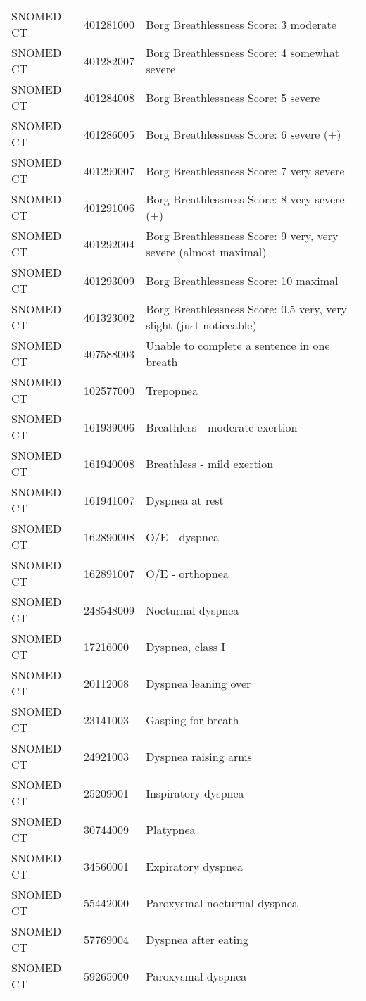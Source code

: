 \begin{longtable}{p{}p{}p{}}
  SNOMED CT & 401281000 & Borg Breathlessness Score: 3 moderate \\ 
  SNOMED CT & 401282007 & Borg Breathlessness Score: 4 somewhat severe \\ 
  SNOMED CT & 401284008 & Borg Breathlessness Score: 5 severe \\ 
  SNOMED CT & 401286005 & Borg Breathlessness Score: 6 severe (+) \\ 
  SNOMED CT & 401290007 & Borg Breathlessness Score: 7 very severe \\ 
  SNOMED CT & 401291006 & Borg Breathlessness Score: 8 very severe (+) \\ 
  SNOMED CT & 401292004 & Borg Breathlessness Score: 9 very, very severe (almost maximal) \\ 
  SNOMED CT & 401293009 & Borg Breathlessness Score: 10 maximal \\ 
  SNOMED CT & 401323002 & Borg Breathlessness Score: 0.5 very, very slight (just noticeable) \\ 
  SNOMED CT & 407588003 & Unable to complete a sentence in one breath \\ 
  SNOMED CT & 102577000 & Trepopnea \\ 
  SNOMED CT & 161939006 & Breathless - moderate exertion \\ 
  SNOMED CT & 161940008 & Breathless - mild exertion \\ 
  SNOMED CT & 161941007 & Dyspnea at rest \\ 
  SNOMED CT & 162890008 & O/E - dyspnea \\ 
  SNOMED CT & 162891007 & O/E - orthopnea \\ 
  SNOMED CT & 248548009 & Nocturnal dyspnea \\ 
  SNOMED CT & 17216000 & Dyspnea, class I \\ 
  SNOMED CT & 20112008 & Dyspnea leaning over \\ 
  SNOMED CT & 23141003 & Gasping for breath \\ 
  SNOMED CT & 24921003 & Dyspnea raising arms \\ 
  SNOMED CT & 25209001 & Inspiratory dyspnea \\ 
  SNOMED CT & 30744009 & Platypnea \\ 
  SNOMED CT & 34560001 & Expiratory dyspnea \\ 
  SNOMED CT & 55442000 & Paroxysmal nocturnal dyspnea \\ 
  SNOMED CT & 57769004 & Dyspnea after eating \\ 
  SNOMED CT & 59265000 & Paroxysmal dyspnea \\ 

\end{longtable}
